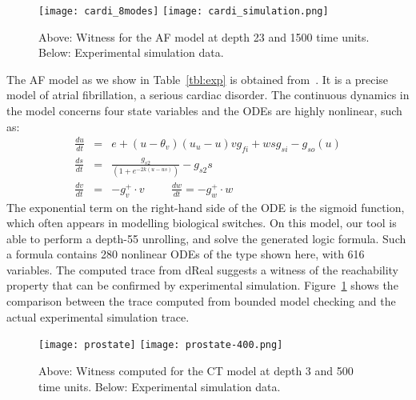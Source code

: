 \documentclass[11pt]{article}
\begin{document}
\begin{figure}[h!]
\begin{center}
\texttt{[image: cardi\_8modes]}
\texttt{[image: cardi\_simulation.png]}
\end{center}
\caption{Above: Witness for the AF model at depth 23 and 1500 time units. Below: Experimental simulation data.}\label{cardi}
\end{figure}
The AF model as we show in Table~\ref{tbl:exp} is obtained from~\cite{DBLP:conf/cav/GrosuBFGGSB11}. It is a precise model of atrial fibrillation, a serious cardiac disorder. The continuous dynamics in the model concerns four state variables and the ODEs are highly nonlinear, such as:
\begin{eqnarray*}
\frac{du}{dt} &=& e + (u-\theta_v)(u_u-u ) v g_{fi} + wsg_{si}-g_{so}(u)\\
\frac{ds}{dt} &=& \displaystyle\frac{g_{s2}}{(1+e^{-2k(u-us)})} -  g_{s2}s\\
\frac{dv}{dt} &=& -g_v^+\cdot v \hspace{1cm} \frac{dw}{dt} = -g_w^+\cdot w
\end{eqnarray*}
The exponential term on the right-hand side of the ODE is the sigmoid function, which  often appears in modelling biological switches. On this model, our tool is able to perform a depth-55 unrolling, and solve the generated logic formula. Such a formula contains 280 nonlinear ODEs of the type shown here, with 616 variables. The computed trace from {\sf dReal} suggests a witness of the reachability property that can be confirmed by experimental simulation. Figure~\ref{cardi} shows the comparison between the trace computed from bounded model checking and the actual experimental simulation trace.
\begin{figure}[h!]
\begin{center}
\texttt{[image: prostate]}
\texttt{[image: prostate-400.png]}
\end{center}
\caption{Above: Witness computed for the CT model at depth 3 and 500 time units. Below: Experimental simulation data.}\label{ct}
\end{figure}
\end{document}
